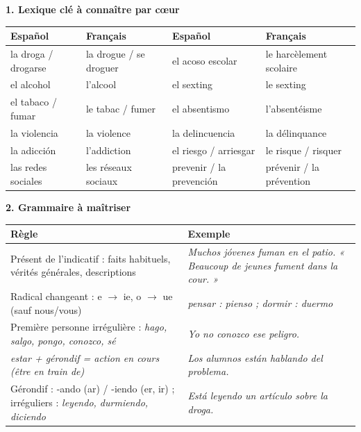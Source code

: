 \documentclass[11pt]{article}
\newcommand{\esp}[1]{\ifmmode\text{\textit{#1}}\else\begingroup\selectlanguage{spanish}\itshape #1\endgroup\fi}
\begin{document}
\begin{bilan}

\textbf{1. Lexique clé à connaître par cœur}

\begin{center}
\begin{tabularx}{\linewidth}{|X|X|X|X|}
\hline
\rowcolor{popblueL} Español & Français & Español & Français \\
\hline
la droga / drogarse & la drogue / se droguer & el acoso escolar & le harcèlement scolaire \\
\hline
el alcohol & l'alcool & el sexting & le sexting \\
\hline
el tabaco / fumar & le tabac / fumer & el absentismo & l'absentéisme \\
\hline
la violencia & la violence & la delincuencia & la délinquance \\
\hline
la adicción & l'addiction & el riesgo / arriesgar & le risque / risquer \\
\hline
las redes sociales & les réseaux sociaux & prevenir / la prevención & prévenir / la prévention \\
\hline
\end{tabularx}
\end{center}

\textbf{2. Grammaire à maîtriser}

\begin{center}
\begin{tabularx}{\linewidth}{|X|X|}
\hline
\rowcolor{popgreenL} Règle & Exemple \\
\hline
Présent de l'indicatif : faits habituels, vérités générales, descriptions & \esp{Muchos jóvenes fuman en el patio.} « Beaucoup de jeunes fument dans la cour. » \\
\hline
Radical changeant : e $\rightarrow$ ie, o $\rightarrow$ ue (sauf nous/vous) & \esp{pensar : pienso} ; \esp{dormir : duermo} \\
\hline
Première personne irrégulière : \esp{hago, salgo, pongo, conozco, sé} & \esp{Yo no conozco ese peligro.} \\
\hline
\esp{estar} + gérondif = action en cours (être en train de) & \esp{Los alumnos están hablando del problema.} \\
\hline
Gérondif : -ando (ar) / -iendo (er, ir) ; irréguliers : \esp{leyendo, durmiendo, diciendo} & \esp{Está leyendo un artículo sobre la droga.} \\
\hline
\end{tabularx}
\end{center}


\end{bilan}
\end{document}
